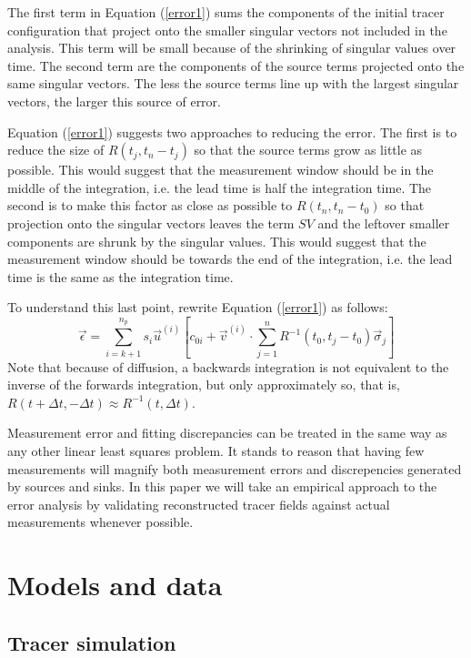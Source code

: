 \documentclass{article}
\begin{document}
The first term in Equation (\ref{error1}) sums the components of the initial tracer configuration that project onto the smaller singular vectors not included in the analysis. 
This term will be small because of the shrinking of singular values over time.
The second term are the components of the source terms projected onto the same singular vectors.
The less the source terms line up with the largest singular vectors, the
larger this source of error.

Equation (\ref{error1}) suggests two approaches to reducing the error.
The first is to reduce the size of $R(t_j, t_n-t_j)$ so that the source terms
grow as little as possible.
This would suggest that the measurement window should be in the middle
of the integration, i.e. the lead time is half the integration time.
The second is to make this factor as close as possible to $R(t_n, t_n-t_0)$
so that projection onto the singular vectors leaves the term $SV$ and
the leftover smaller components are shrunk by the singular values.
This would suggest that the measurement window should be towards the end
of the integration, i.e. the lead time is the same as the integration time.

To understand this last point, rewrite Equation (\ref{error1}) as follows:
\begin{equation}
	\vec \epsilon = \sum_{i=k+1}^{n_p} s_i \vec u^{(i)} \left [c_{0i}
	+ \vec v^{(i)} \cdot \sum_{j=1}^n R^{-1}(t_0, t_j-t_0) \vec \sigma_j \right ]
\end{equation}
Note that because of diffusion, 
a backwards integration is not equivalent to the inverse of the
forwards integration, but only approximately so, that is,
$R(t+\Delta t, -\Delta t) \approx R^{-1}(t, \Delta t)$.

Measurement error and fitting discrepancies can be treated in the same way 
as any other linear least squares problem. 
It stands to reason that having few measurements will magnify both
measurement errors and discrepencies generated by sources and sinks.
In this paper we will take an empirical approach to the error analysis by
validating reconstructed tracer fields against actual measurements whenever
possible.

\section{Models and data}

\subsection{Tracer simulation}
\end{document}
